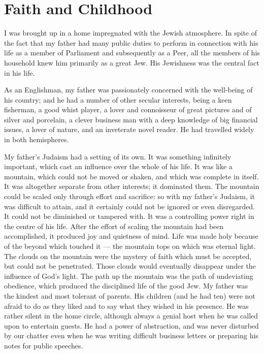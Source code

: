\chapter{Faith and Childhood}

I was brought up in a home impregnated with the
Jewish atmosphere. In spite of the fact that my father
had many public duties to perform in connection with
his life as a member of Parliament and subsequently as
a Peer, all the members of his household knew him
primarily as a great Jew. His Jewishness was the
central fact in his life.

As an Englishman, my father was passionately
concerned with the well-being of his country; and he had
a number of other secular interests, being a keen fisherman,
a good whist player, a lover and connoisseur of
great pictures and of silver and porcelain, a clever
business man with a deep knowledge of big financial
issues, a lover of nature, and an inveterate novel reader.
He had travelled widely in both hemispheres.

My father’s Judaism had a setting of its own. It
was something infinitely important, which cast an
influence over the whole of his life. It was like a mountain,
which could not be moved or shaken, and which
was complete in itself. It was altogether separate from
other interests; it dominated them. The mountain could
be scaled only through effort and sacrifice: so with my
father’s Judaism, it was difficult to attain, and it
certainly could not be ignored or even disregarded. It
could not be diminished or tampered with. It was a
controlling power right in the centre of his life. After
the effort of scaling the mountain had been accomplished,
it produced joy and quietness of mind. Life
was made holy because of the beyond which touched it —
the mountain tops on which was eternal light. The
clouds on the mountain were the mystery of faith which
must be accepted, but could not be penetrated. Those
clouds would eventually disappear under the influence
of God's light. The path up the mountain was the path
of undeviating obedience, which produced the disciplined
life of the good Jew. My father was the kindest and most
tolerant of parents. His children (and he had ten)
were not afraid to do as they liked and to say what they
wished in his presence. He was rather silent in the home
circle, although always a genial host when he was
called upon to entertain guests. He had a power of
abstraction, and was never disturbed by our chatter
even when he was writing difficult business letters or
preparing his notes for public speeches.

